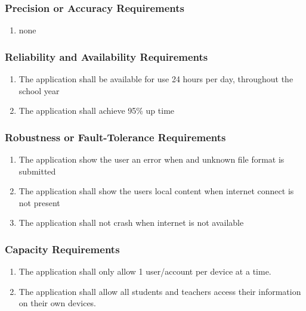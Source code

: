 \documentclass[]{article}
\begin{document}
\subsubsection{Precision or Accuracy Requirements}
\label{ssub:precision_or_accuracy_requirements}
\begin{enumerate}[{PR}1. ]
	\item none
\end{enumerate}

\subsubsection{Reliability and Availability Requirements}
\label{ssub:reliability_and_availability_requirements}
\begin{enumerate}[{PR}1. ]
	\item The application shall be available for use 24 hours per day, throughout the school year
	\item The application shall achieve 95\% up time
\end{enumerate}

\subsubsection{Robustness or Fault-Tolerance Requirements}
\label{ssub:robustness_or_fault_tolerance_requirements}
\begin{enumerate}[{PR}1. ]
	\item The application show the user an error when and unknown file format is submitted
	\item The application shall show the users local content when internet connect is not present
	\item The application shall not crash when internet is not available
\end{enumerate}

\subsubsection{Capacity Requirements}
\label{ssub:capacity_requirements}
\begin{enumerate}[{PR}1. ]
	\item The application shall only allow 1 user/account per device at a time.
	\item The application shall allow all students and teachers access their information on their own devices.
\end{enumerate}
\end{document}
